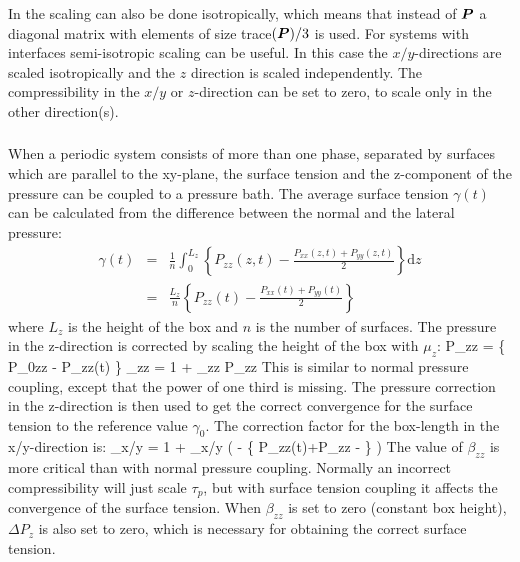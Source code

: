 In {\gromacs} the scaling can also be done isotropically, which means that
instead of $\mbox{\boldmath ${P}$}$ a diagonal matrix with elements of size
trace$(\mbox{\boldmath ${P}$})/3$ is used.
For systems with interfaces semi-isotropic scaling can be useful.
In this case the $x/y$-directions are scaled isotropically and the $z$
direction is scaled independently. The compressibility in the $x/y$ or
$z$-direction can be set to zero, to scale only in the other direction(s).

\subsubsection*{}
When a periodic system consists of more than one phase, separated by
surfaces which are parallel to the xy-plane,
the surface tension and the z-component of the pressure can be coupled
to a pressure bath.
The average surface tension $\gamma(t)$ can be calculated from
the difference between the normal and the lateral pressure:
\begin{eqnarray}
\gamma(t) & = & 
\frac{1}{n} \int_0^{L_z}
\left\{ P_{zz}(z,t) - \frac{P_{xx}(z,t) + P_{yy}(z,t)}{2} \right\} \mbox{d}z \\
& = &
\frac{L_z}{n} \left\{ P_{zz}(t) - \frac{P_{xx}(t) + P_{yy}(t)}{2} \right\}
\end{eqnarray}
where $L_z$ is the height of the box and $n$ is the number of surfaces.
The pressure in the z-direction is corrected by scaling the height of
the box with $\mu_z$:
\beq
\Delta P_{zz} =  \{ P_{0zz} - P_{zz}(t) \}
\eeq
\beq
\mu_{zz} = 1 + \beta_{zz} \Delta P_{zz}
\eeq
This is similar to normal pressure coupling, except that the power
of one third is missing. 
The pressure correction in the z-direction is then used to get the
correct convergence for the surface tension to the reference value $\gamma_0$.
The correction factor for the box-length in the x/y-direction is:
\beq
\mu_{x/y} = 1 +  \beta_{x/y}
        \left( 
        - \left\{ P_{zz}(t)+\Delta P_{zz} -  \right\} 
        \right)
\eeq
The value of $\beta_{zz}$ is more critical than with normal pressure
coupling. Normally an incorrect compressibility will just scale $\tau_p$,
but with surface tension coupling it affects the convergence of the surface
tension. 
When $\beta_{zz}$ is set to zero (constant box height), $\Delta P_z$ is also set
to zero, which is necessary for obtaining the correct surface tension. 

